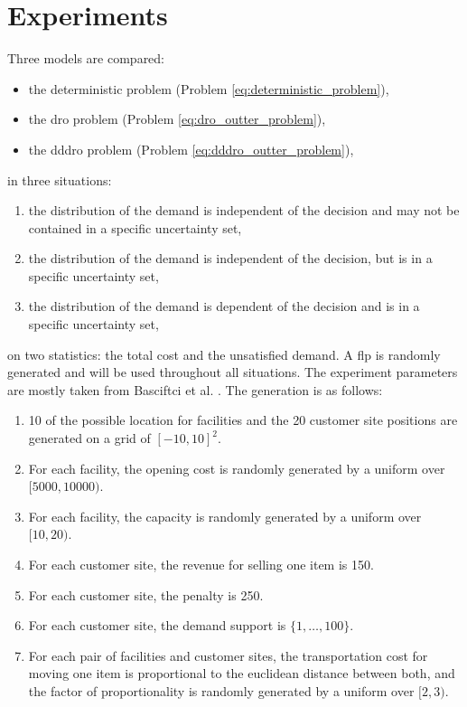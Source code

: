 \documentclass[12pt, letterpaper]{article}
\begin{document}
	\section{Experiments}
	Three models are compared:
	\begin{itemize}
		\item the deterministic problem (Problem \eqref{eq:deterministic_problem}),
		\item the \gls{dro} problem (Problem \eqref{eq:dro_outter_problem}),
		\item the \gls{dddro} problem (Problem \eqref{eq:dddro_outter_problem}),
	\end{itemize}
	in three situations:
	\begin{enumerate}
		\item the distribution of the demand is independent of the decision and may not be contained in a specific uncertainty set, \label{sit:ind_rand}
		\item the distribution of the demand is independent of the decision, but is in a specific uncertainty set, \label{sit:ind_unc}
		\item the distribution of the demand is dependent of the decision and is in a specific uncertainty set, \label{sit:dep_unc}
	\end{enumerate}
	on two statistics: the total cost and the unsatisfied demand. A \gls{flp} is randomly generated and will be used throughout all situations. The experiment parameters are mostly taken from Basciftci et al. \cite{basciftci_distributionally_2021}. The generation is as follows:
	\begin{enumerate}
		\item 10 of the possible location for facilities and the 20 customer site positions are generated on a grid of $[-10, 10]^2$.
		\item For each facility, the opening cost is randomly generated by a uniform over $[5000, 10000)$.
		\item For each facility, the capacity is randomly generated by a uniform over $[10, 20)$.
		\item For each customer site, the revenue for selling one item is 150.
		\item For each customer site, the penalty is 250.
		\item For each customer site, the demand support is $\{1, \dots, 100\}$.
		\item For each pair of facilities and customer sites, the transportation cost for moving one item is proportional to the euclidean distance between both, and the factor of proportionality is randomly generated by a uniform over $[2, 3)$.
	\end{enumerate}
	
\end{document}
